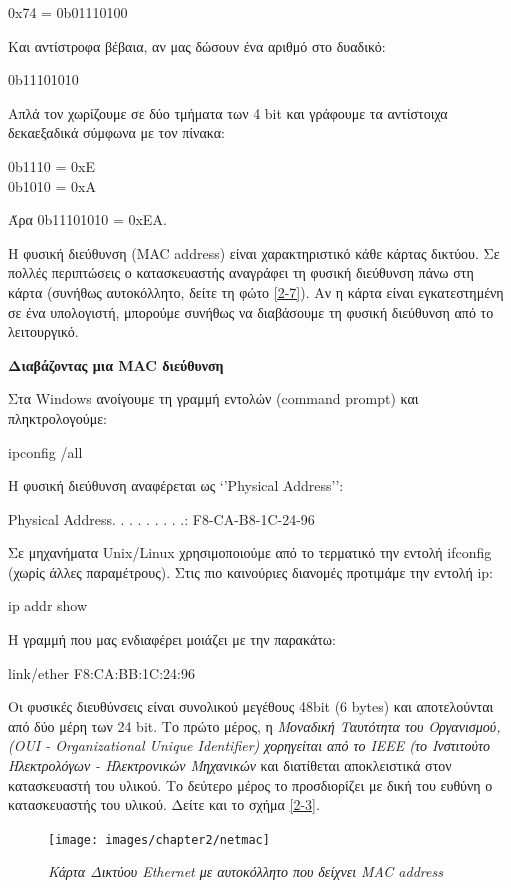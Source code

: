 \begin{inthebox}
0x74 = 0b01110100

Και αντίστροφα βέβαια, αν μας δώσουν ένα αριθμό στο δυαδικό:

0b11101010

Απλά τον χωρίζουμε σε δύο τμήματα των 4 bit και γράφουμε τα αντίστοιχα δεκαεξαδικά σύμφωνα με τον πίνακα:

0b1110 = 0xΕ \\
0b1010 = 0xΑ

Άρα 0b11101010 = 0xEA.\\
\end{inthebox}

Η φυσική διεύθυνση (MAC address) είναι χαρακτηριστικό κάθε κάρτας δικτύου. Σε πολλές περιπτώσεις ο κατασκευαστής αναγράφει τη φυσική διεύθυνση πάνω στη κάρτα (συνήθως αυτοκόλλητο, δείτε τη φώτο \ref{2-7}). Αν η κάρτα είναι εγκατεστημένη σε ένα υπολογιστή, μπορούμε συνήθως να διαβάσουμε τη φυσική διεύθυνση από το λειτουργικό.

\begin{inthebox}
\textbf{Διαβάζοντας μια MAC διεύθυνση}

Στα Windows ανοίγουμε τη γραμμή εντολών (command prompt) και πληκτρολογούμε:

ipconfig /all

Η φυσική διεύθυνση αναφέρεται ως `'Physical Address'':

Physical Address. . . . . . . . .: F8-CA-B8-1C-24-96

Σε μηχανήματα Unix/Linux χρησιμοποιούμε από το τερματικό την εντολή ifconfig (χωρίς άλλες παραμέτρους). Στις πιο καινούριες διανομές προτιμάμε την εντολή ip:

ip addr show

Η γραμμή που μας ενδιαφέρει μοιάζει με την παρακάτω:

link/ether F8:CA:BB:1C:24:96\\
\end{inthebox}

Οι φυσικές διευθύνσεις είναι συνολικού μεγέθους 48bit (6 bytes) και αποτελούνται από δύο μέρη των 24 bit. Το πρώτο μέρος, η \emph{Μοναδική Ταυτότητα του Οργανισμού, (OUI - Organizational Unique Identifier) χορηγείται από το IEEE (το Ινστιτούτο Ηλεκτρολόγων - Ηλεκτρονικών Μηχανικών} και διατίθεται αποκλειστικά στον κατασκευαστή του υλικού. Το δεύτερο μέρος το προσδιορίζει με δική του ευθύνη ο κατασκευαστής του υλικού. Δείτε και το σχήμα \ref{2-3}.

\begin{figure}[!ht]
  \centering
  \texttt{[image: images/chapter2/netmac]}
  \caption {\textsl{Κάρτα Δικτύου Ethernet με αυτοκόλλητο που δείχνει MAC address}}
\end{figure}

